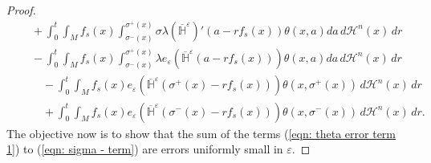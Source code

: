 \documentclass[11pt]{article}
\begin{document}
\begin{proof}
\begin{align}
    \label{eqn: theta error term 1}
    &\quad+ \int_0^t \int_M f_s(x) \int_{\sigma^-(x)}^{\sigma^+(x)} \sigma\lambda  (\overline{\mathbb{H}}^\varepsilon)'(a - rf_s(x))\theta(x,a) da\,d\mathcal{H}^n(x)\,dr\\
    \label{eqn: theta error term 2}
    &\quad - \int_0^t \int_M f_s(x) \int_{\sigma^-(x)}^{\sigma^+(x)} \lambda e_\varepsilon(\overline{\mathbb{H}}^\varepsilon(a - rf_s(x))) \theta(x,a) da \, d\mathcal{H}^n(x) \, dr\\
    \label{eqn: sigma + term}
    &\quad\quad -\int_0^t\int_M f_s(x) e_\varepsilon\left(\overline{\mathbb{H}}^\varepsilon(\sigma^+(x) - rf_s(x))\right)\theta(x,\sigma^+(x)) \, d\mathcal{H}^n(x)\,dr\\
    \label{eqn: sigma - term}
    &\quad\quad +\int_0^t\int_M f_s(x) e_\varepsilon\left(\overline{\mathbb{H}}^\varepsilon(\sigma^-(x) - rf_s(x))\right)\theta(x,\sigma^-(x)) \, d\mathcal{H}^n(x)\,dr.
\end{align}
The objective now is to show that the sum of the terms (\ref{eqn: theta error term 1}) to (\ref{eqn: sigma - term}) are errors uniformly small in $\varepsilon$.

\bigskip


\end{proof}
\end{document}
